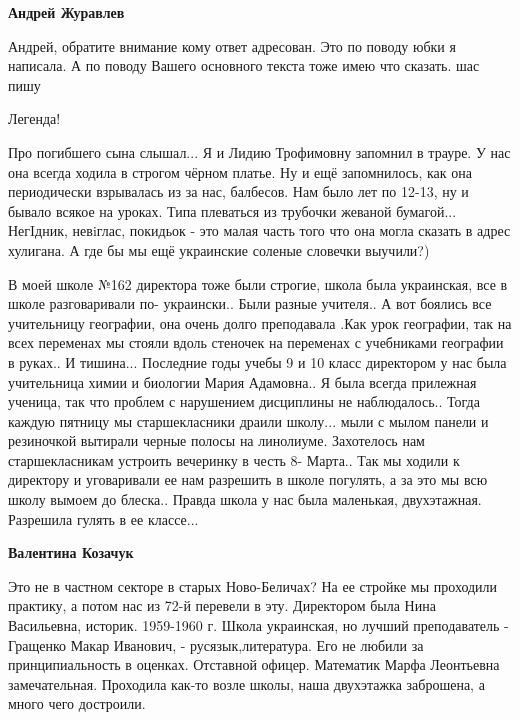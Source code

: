 \begin{itemize}
\begin{itemize}
\begin{itemize}
\textbf{Андрей Журавлев} 

Андрей, обратите внимание кому ответ адресован. Это по поводу юбки я написала. А
по поводу Вашего основного текста тоже имею что сказать. шас пишу

\end{itemize} %

Легенда!


Про погибшего сына слышал... Я и Лидию Трофимовну запомнил в трауре. У нас она
всегда ходила в строгом чёрном платье. Ну и ещё запомнилось, как она
периодически взрывалась из за нас, балбесов. Нам было лет по 12-13, ну и бывало
всякое на уроках. Типа плеваться из трубочки жеваной бумагой... НегIдник,
невiглас, покидьок - это малая часть того что она могла сказать в адрес
хулигана. А где бы мы ещё украинские соленые словечки выучили?)

\end{itemize} %


В моей школе №162 директора тоже были строгие, школа была украинская, все в
школе разговаривали по- украински.. Были разные учителя.. А вот боялись все
учительницу географии, она очень долго преподавала .Как урок географии, так на
всех переменах мы стояли вдоль стеночек на переменах с учебниками географии в
руках.. И тишина... Последние годы учебы 9 и 10 класс директором у нас была
учительница химии и биологии Мария Адамовна.. Я была всегда прилежная ученица,
так что проблем с нарушением дисциплины не наблюдалось.. Тогда каждую пятницу
мы старшекласники драили школу... мыли с мылом панели и резиночкой вытирали
черные полосы на линолиуме. Захотелось нам старшекласникам устроить вечеринку в
честь 8- Марта.. Так мы ходили к директору и уговаривали ее нам разрешить в
школе погулять, а за это мы всю школу вымоем до блеска.. Правда школа у нас была
маленькая, двухэтажная. Разрешила гулять в ее классе...

\begin{itemize} %
\textbf{Валентина Козачук} 

Это не в частном секторе в старых Ново-Беличах? На ее стройке мы проходили
практику, а потом нас из 72-й перевели в эту. Директором была Нина Васильевна,
историк. 1959-1960 г. Школа украинская, но лучший преподаватель - Гращенко
Макар Иванович, - русязык,литература. Его не любили за принципиальность в
оценках. Отставной офицер. Математик Марфа Леонтьевна замечательная. Проходила
как-то возле школы, наша двухэтажка заброшена, а много чего достроили.


\end{itemize}
\end{itemize}
